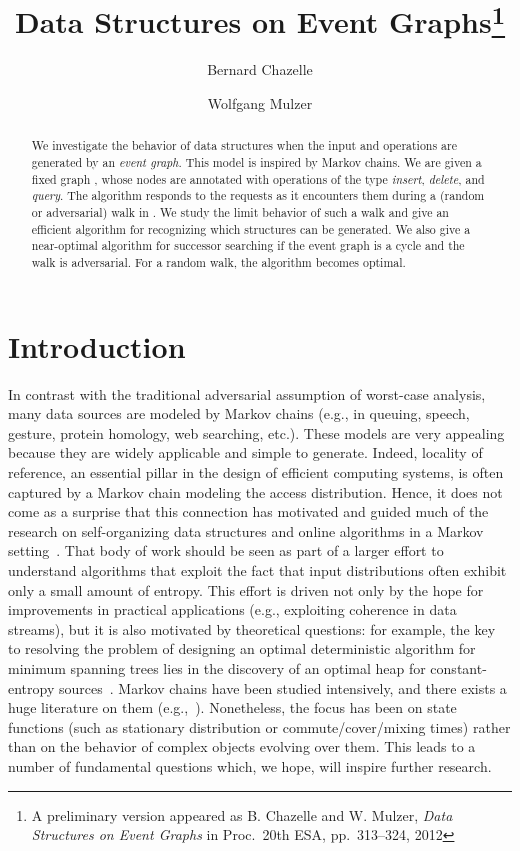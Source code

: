 \documentclass[oribibl,envcountsect,envcountsame]{llncs}
\title{Data Structures on Event Graphs\thanks{A preliminary
version appeared as B. Chazelle and W. Mulzer,
\emph{Data Structures on Event Graphs} in Proc.~20th ESA, pp.~313--324, 2012}}
\date{}
\author{
Bernard Chazelle\inst{1}
\and
Wolfgang Mulzer\inst{2}
}
\institute{
Department of Computer Science, Princeton University, USA
\email{chazelle@cs.princeton.edu}
\and
Institut f{\"ur} Informatik, Freie Universit{\"a}t Berlin, Germany
\email{mulzer@inf.fu-berlin.de}
}
\begin{document}
 \maketitle

\begin{abstract}
We investigate the behavior of 
data structures when the input
and operations are generated by an
\emph{event graph}. 
This model is inspired by 
Markov chains.
We are given a fixed graph ,
whose nodes 
are annotated with operations of the type 
\emph{insert}, \emph{delete}, and \emph{query}.
The algorithm responds to the requests 
as it encounters them during a (random or adversarial) walk in .
We study the  limit behavior  of such a 
walk and give an efficient algorithm for recognizing which structures
can be generated.
We also give a near-optimal algorithm for successor searching if
the event graph is a cycle and the walk is adversarial. For a random
walk, the algorithm becomes optimal. 
\end{abstract}




\section{Introduction}\label{introduction}

In contrast with the traditional adversarial assumption
of worst-case analysis,
many data sources are modeled by Markov chains
(e.g., in queuing, speech, gesture, protein homology,
web searching, etc.). These models are very appealing
because they are  widely applicable and simple
to generate.
Indeed, locality of reference, an essential pillar in the
design of efficient computing systems, is often captured by 
a Markov chain modeling the access distribution.
Hence, it does not come as a surprise that 
this connection has motivated and guided much
of the research on self-organizing data 
structures and online algorithms
in a Markov setting~\cite{Chassaing93,Hotz93,KapoorRe91,KarlinPhRa00,
KonnekerVa81,LamLeSi84,PhatarfodPrDy97,SchulzSc96,ShedlerTu72,VitterKr96}.
That body of work should be seen as part of 
a larger effort to understand
algorithms that exploit the fact that
input distributions often exhibit only a small amount
of entropy. This effort is driven not only by the
hope for improvements in practical applications 
(e.g., exploiting coherence in data streams),
but it is also motivated by theoretical questions: for example, the key 
to resolving the problem of designing an optimal
deterministic algorithm for minimum spanning trees lies in
the discovery of an optimal heap for constant-entropy 
sources~\cite{Chazelle00}.
Markov chains have been studied intensively, and there
exists a huge literature on them (e.g.,~\cite{LevinPeWi09}).
Nonetheless, the focus has been on state functions
(such as stationary distribution or commute/cover/mixing times)
rather than on the behavior of complex objects evolving over them.
This leads to a number of fundamental questions which, we hope,
will inspire further research.
\end{document}
